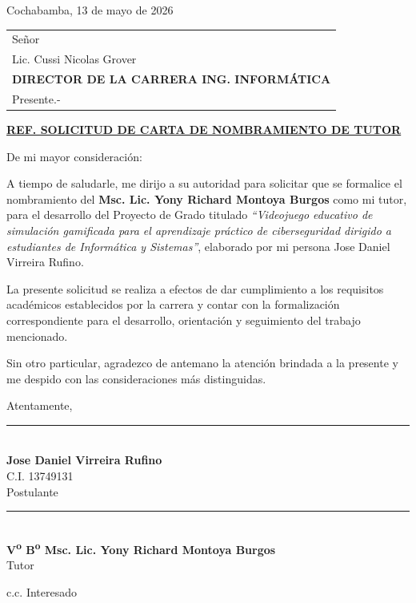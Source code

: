 \documentclass[12pt,letterpaper]{article}
\begin{document}

\thispagestyle{empty}

\begin{flushright}
Cochabamba, 13 de mayo de 2026
\end{flushright}

\vspace*{1cm}

\noindent\begin{tabular}{@{}l@{}}
Señor\\[0.03cm]
Lic. Cussi Nicolas Grover\\[0.03cm]
\textbf{DIRECTOR DE LA CARRERA ING. INFORMÁTICA}\\[0.03cm]
Presente.-
\end{tabular}

\vspace{0.75cm}

\begin{center}
\textbf{\underline{REF. SOLICITUD DE CARTA DE NOMBRAMIENTO DE TUTOR}}
\end{center}

\vspace{0.5cm}

De mi mayor consideración:

\vspace{1cm}

A tiempo de saludarle, me dirijo a su autoridad para solicitar que se formalice el nombramiento del \textbf{Msc. Lic. Yony Richard Montoya Burgos} como mi tutor, para el desarrollo del Proyecto de Grado titulado \textit{``Videojuego educativo de simulación gamificada para el aprendizaje práctico de ciberseguridad dirigido a estudiantes de Informática y Sistemas''}, elaborado por mi persona Jose Daniel Virreira Rufino.

La presente solicitud se realiza a efectos de dar cumplimiento a los requisitos académicos establecidos por la carrera y contar con la formalización correspondiente para el desarrollo, orientación y seguimiento del trabajo mencionado.

Sin otro particular, agradezco de antemano la atención brindada a la presente y me despido con las consideraciones más distinguidas.

\vspace{1.4cm}

Atentamente,

\vspace{2cm}

\begin{minipage}[t]{0.48\textwidth}
\centering
\rule{7cm}{0.4pt}\\
\textbf{Jose Daniel Virreira Rufino}\\
C.I. 13749131\\
Postulante
\end{minipage}
\hfill
\begin{minipage}[t]{0.48\textwidth}
\centering
\rule{7cm}{0.4pt}\\
\textbf{V\textsuperscript{o} B\textsuperscript{o} Msc. Lic. Yony Richard Montoya Burgos}\\
Tutor
\end{minipage}

\vfill

\begin{flushleft}
c.c. Interesado
\end{flushleft}
\end{document}
